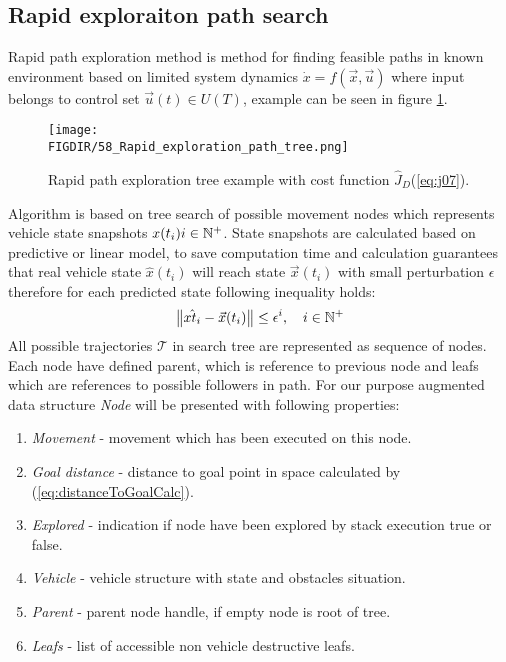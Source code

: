 \subsection{Rapid exploraiton path search}
\noindent Rapid path exploration method is method for finding feasible paths in known environment based on limited system dynamics $\dot{x}=f(\vec{x},\vec{u})$ where input belongs to control  set $\vec{u}(t)\in U(T)$, example can be seen in figure \ref{fig:58rapidPathExploaation}.
\begin{figure}[H]
    \centering
    \texttt{[image: \\FIGDIR/58\_Rapid\_exploration\_path\_tree.png]}
    \caption{Rapid path exploration tree example with cost function $\hat{J}_D$(\ref{eq:j07}).}
    \label{fig:58rapidPathExploaation}
\end{figure}
\noindent Algorithm is based on tree search of possible movement nodes which represents vehicle state snapshots $x(t_i) i\in \mathbb{N}^+$. State snapshots are calculated based on predictive or linear model, to save computation time and calculation guarantees that real vehicle state $\hat{x}(t_i)$ will reach  state $\vec{x}(t_i)$ with small perturbation $\epsilon$ therefore for each predicted state following inequality holds:
\begin{equation}\label{eq:marginalErrorofPrediction}
    \left\lVert\hat{x{t_i}}-\vec{x}(t_i)\right\rVert\le \epsilon^i,\quad i \in \mathbb{N}^+
\end{equation}
\noindent All possible trajectories $\mathscr{T}$ in search tree are represented as sequence of nodes. Each node have defined parent, which is reference to previous node and leafs which are references to possible followers in path. For our purpose augmented data structure \textit{Node} will be presented with following properties:
\begin{enumerate}
    \item \textit{Movement} - movement which has been executed on this node.
    \item \textit{Goal distance} - distance to goal point in space calculated by (\ref{eq:distanceToGoalCalc}).
    \item \textit{Explored} - indication if node have been explored by stack execution true or false.
    \item \textit{Vehicle} - vehicle structure with state and obstacles situation.
    \item \textit{Parent} - parent node handle, if empty node is root of tree. 
    \item \textit{Leafs} - list of accessible non vehicle destructive leafs.
\end{enumerate}
